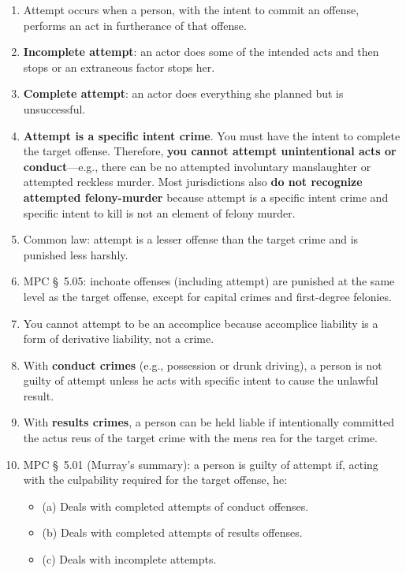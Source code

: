 \begin{enumerate}
    \item Attempt occurs when a person, with the intent to commit an offense, 
    performs an act in furtherance of that offense.
    \item \textbf{Incomplete attempt}: an actor does some of the intended acts 
    and then stops or an extraneous factor stops her.
    \item \textbf{Complete attempt}: an actor does everything she planned but 
    is unsuccessful.
    \item \textbf{Attempt is a specific intent crime}. You must have the 
    intent to complete the target offense. Therefore, \textbf{you cannot 
    attempt unintentional acts or conduct}---e.g., there can be no attempted 
    involuntary manslaughter or attempted reckless murder. Most jurisdictions 
    also \textbf{do not recognize attempted felony-murder} because attempt is 
    a specific intent crime and specific intent to kill is not an element of 
    felony murder.
    \item Common law: attempt is a lesser offense than the target crime and is 
    punished less harshly.
    \item MPC \S\ 5.05: inchoate offenses (including attempt) are punished at 
    the same level as the target offense, except for capital crimes and 
    first-degree felonies.
    \item You cannot attempt to be an accomplice because accomplice liability 
    is a form of derivative liability, not a crime.
    \item With \textbf{conduct crimes} (e.g., possession or drunk driving), a 
    person is not guilty of attempt unless he acts with specific intent to 
    cause the unlawful result.
    \item With \textbf{results crimes}, a person can be held liable if 
    intentionally committed the actus reus of the target crime with the mens 
    rea for the target crime. 
    \item MPC \S\ 5.01 (Murray's summary): a person is guilty of attempt if, 
    acting with the culpability required for the target offense, he:
    \begin{itemize}
        \item (a) Deals with completed attempts of conduct offenses.
        \item (b) Deals with completed attempts of results offenses.
        \item (c) Deals with incomplete attempts.

\end{itemize}
\end{enumerate}
